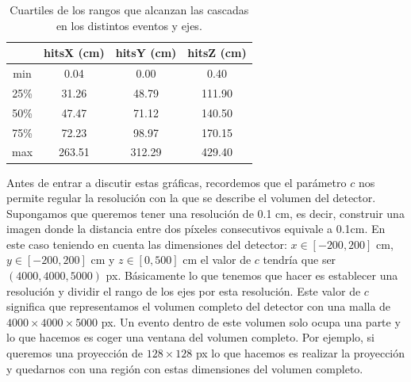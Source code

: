 \documentclass[a4paper,12pt,twoside,titlepage]{article}
\begin{document}
\begin{table}[h!]
  \centering
  \begin{tabular}{|c|c|c|c|}
  \hline
           &  hitsX (cm) &  hitsY (cm) &  hitsZ (cm) \\ \hline
  min      &        0.04 &        0.00 &        0.40 \\ \hline
  25\%     &       31.26 &       48.79 &      111.90 \\ \hline
  50\%     &       47.47 &       71.12 &      140.50 \\ \hline
  75\%     &       72.23 &       98.97 &      170.15 \\ \hline
  max      &      263.51 &      312.29 &      429.40 \\ \hline
\end{tabular}
\caption{Cuartiles de los rangos que alcanzan las cascadas en los distintos eventos y ejes.}
\label{tab:cuartiles_rango}
\end{table}

Antes de entrar a discutir estas gráficas, recordemos que el parámetro $c$ nos permite regular la resolución con la que se describe el volumen del detector. Supongamos que queremos tener una resolución de 0.1 cm, es decir, construir una imagen donde la distancia entre dos píxeles consecutivos equivale a 0.1cm. En este caso teniendo en cuenta las dimensiones del detector: $x \in [-200, 200]$ cm, $y \in [-200, 200]$ cm y $z \in [0, 500]$ cm el valor de $c$ tendría que ser $(4000, 4000, 5000)$ px. Básicamente lo que tenemos que hacer es establecer una resolución y dividir el rango de los ejes por esta resolución. Este valor de $c$ significa que representamos el volumen completo del detector con una malla de $4000\times 4000\times 5000$ px. Un evento dentro de este volumen solo ocupa una parte y lo que hacemos es coger una ventana del volumen completo. Por ejemplo, si queremos una proyección de $128\times 128$ px lo que hacemos es realizar la proyección y quedarnos con una región con estas dimensiones del volumen completo.
\end{document}
